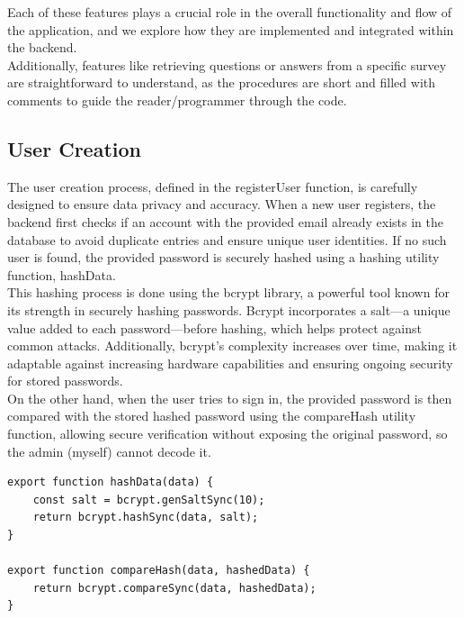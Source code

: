 \noindent Each of these features plays a crucial role in the overall functionality and flow of the application, and we explore how they are implemented and integrated within the backend.\vspace{5mm} \\
Additionally, features like retrieving questions or answers from a specific survey are straightforward to understand, as the procedures are short and filled with comments to guide the reader/programmer through the code.

\subsection{User Creation}

The user creation process, defined in the registerUser function, is carefully designed to ensure data privacy and accuracy. When a new user registers, the backend first checks if an account with the provided email already exists in the database to avoid duplicate entries and ensure unique user identities. If no such user is found, the provided password is securely hashed using a hashing utility function, hashData.\vspace{5mm} \\
This hashing process is done using the bcrypt library, a powerful tool known for its strength in securely hashing passwords. Bcrypt incorporates a salt—a unique value added to each password—before hashing, which helps protect against common attacks. Additionally, bcrypt's complexity increases over time, making it adaptable against increasing hardware capabilities and ensuring ongoing security for stored passwords.\vspace{5mm} \\
On the other hand, when the user tries to sign in, the provided password is then compared with the stored hashed password using the compareHash utility function, allowing secure verification without exposing the original password, so the admin (myself) cannot decode it.

\begin{lstlisting}[caption=Hash Functions]
export function hashData(data) {
    const salt = bcrypt.genSaltSync(10);
    return bcrypt.hashSync(data, salt);
}

export function compareHash(data, hashedData) {
    return bcrypt.compareSync(data, hashedData);
}
\end{lstlisting}

